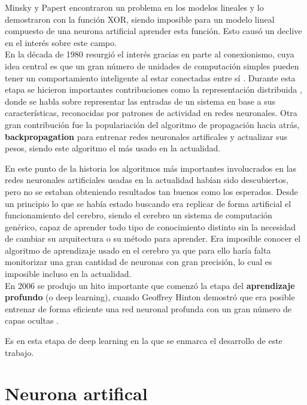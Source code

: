 Minsky y Papert encontraron un problema en los modelos lineales y lo demostraron con la función XOR, siendo imposible para un modelo lineal compuesto de una neurona artificial aprender esta función. Esto causó un declive en el interés sobre este campo.\\

En la década de 1980 resurgió el interés gracias en parte al conexionismo, cuya idea central es que un gran número de unidades de computación simples pueden tener un comportamiento inteligente al estar conectadas entre sí \cite[p16]{Goodfellow2016}. Durante esta etapa se hicieron importantes contribuciones como la representación distribuida \cite{Hinton1986}, donde se habla sobre representar las entradas de un sistema en base a sus características, reconocidas por patrones de actividad en redes neuronales. Otra gran contribución fue la populariación del algoritmo de propagación hacia atrás, \textbf{ backpropagation} \cite{Rumelhart1986} para entrenar redes neuronales artificales y actualizar sus pesos, siendo este algoritmo el más usado en la actualidad. 

En este punto de la historia los algoritmos más importantes involucrados en las redes neuronales artificiales usadas en la actualidad habían sido descubiertos, pero no se estaban obteniendo resultados tan buenos como los esperados. Desde un principio lo que se había estado buscando era replicar de forma artificial el funcionamiento del cerebro, siendo el cerebro un sistema de computación genérico, capaz de aprender todo tipo de conocimiento distinto sin la necesidad de cambiar su arquitectura o su método para aprender. Era imposible conocer el algoritmo de aprendizaje usado en el cerebro ya que para ello haría falta monitorizar una gran cantidad de neuronas con gran precisión, lo cual es imposible incluso en la actualidad.\\

En 2006 se produjo un hito importante que comenzó la etapa del \textbf{aprendizaje profundo} (o deep learning), cuando Geoﬀrey Hinton demostró que era posible entrenar de forma eficiente una red neuronal profunda con un gran número de capas ocultas \cite{Hinton2006}.

Es en esta etapa de deep learning en la que se enmarca el desarrollo de este trabajo.

\section{Neurona artifical}\label{subsec:neurona_artificial}

